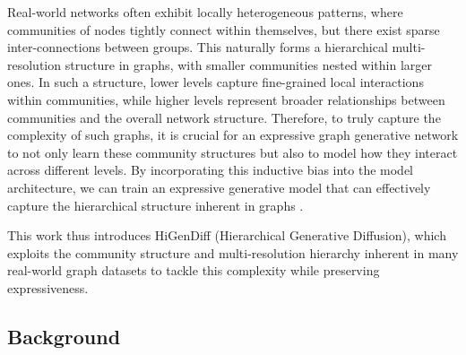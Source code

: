 Real-world networks often exhibit locally heterogeneous patterns, where communities of nodes tightly connect within themselves, but there exist sparse inter-connections between groups.
This naturally forms a hierarchical multi-resolution structure in graphs, with smaller communities nested within larger ones. In such a structure, lower levels capture fine-grained local interactions within communities, while higher levels represent broader relationships between communities and
the overall network structure. Therefore, to truly capture the complexity of such graphs, it is crucial for an expressive graph generative network to not only learn these community structures but also to model how they interact across different levels. By incorporating this inductive bias into the model architecture, we can train an expressive generative model that can effectively capture the hierarchical structure inherent in graphs \cite{karami_multi-resolution_2024}. 

This work thus introduces HiGenDiff (Hierarchical Generative Diffusion), which exploits the community structure and multi-resolution hierarchy inherent in many real-world graph datasets to tackle this complexity while preserving expressiveness.

\subsection{Background}

